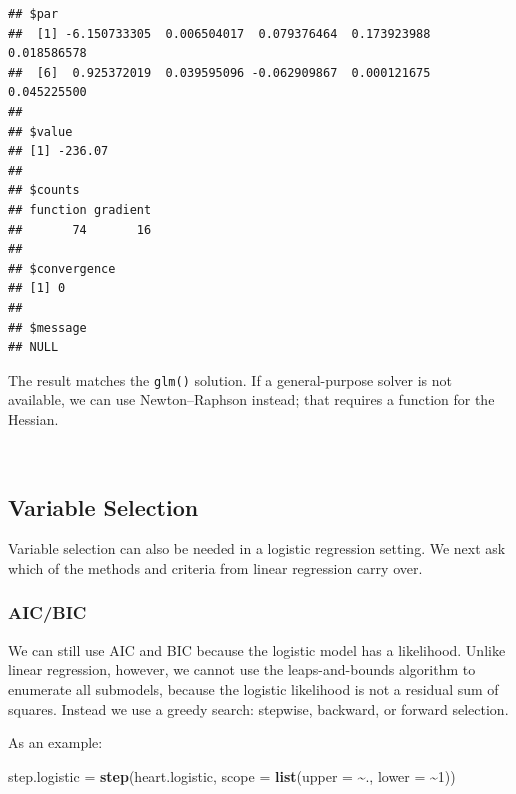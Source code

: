 \documentclass[
]{book}
\newenvironment{Shaded}{\begin{snugshade}}{\end{snugshade}}
\newcommand{\AttributeTok}[1]{\textcolor[rgb]{0.13,0.29,0.53}{#1}}
\newcommand{\DecValTok}[1]{\textcolor[rgb]{0.00,0.00,0.81}{#1}}
\newcommand{\FunctionTok}[1]{\textcolor[rgb]{0.13,0.29,0.53}{\textbf{#1}}}
\newcommand{\NormalTok}[1]{#1}
\newcommand{\OtherTok}[1]{\textcolor[rgb]{0.56,0.35,0.01}{#1}}
\newcommand{\SpecialCharTok}[1]{\textcolor[rgb]{0.81,0.36,0.00}{\textbf{#1}}}
\begin{document}
\begin{verbatim}
## $par
##  [1] -6.150733305  0.006504017  0.079376464  0.173923988  0.018586578
##  [6]  0.925372019  0.039595096 -0.062909867  0.000121675  0.045225500
## 
## $value
## [1] -236.07
## 
## $counts
## function gradient 
##       74       16 
## 
## $convergence
## [1] 0
## 
## $message
## NULL
\end{verbatim}

The result matches the \texttt{glm()} solution. If a general-purpose solver is not available, we can use Newton--Raphson instead; that requires a function for the Hessian.

~~

\subsection{Variable Selection}\label{variable-selection}

Variable selection can also be needed in a logistic regression setting. We next ask which of the methods and criteria from linear regression carry over.

\subsubsection*{AIC/BIC}\label{aicbic}

We can still use AIC and BIC because the logistic model has a likelihood. Unlike linear regression, however, we cannot use the leaps-and-bounds algorithm to enumerate all submodels, because the logistic likelihood is not a residual sum of squares. Instead we use a greedy search: stepwise, backward, or forward selection.

As an example:

\begin{Shaded}
\begin{Highlighting}[]
\NormalTok{step.logistic }\OtherTok{=} \FunctionTok{step}\NormalTok{(heart.logistic, }\AttributeTok{scope =} \FunctionTok{list}\NormalTok{(}\AttributeTok{upper =} \SpecialCharTok{\textasciitilde{}}\NormalTok{.,}
    \AttributeTok{lower =} \SpecialCharTok{\textasciitilde{}}\DecValTok{1}\NormalTok{))}
\end{Highlighting}
\end{Shaded}
\end{document}

